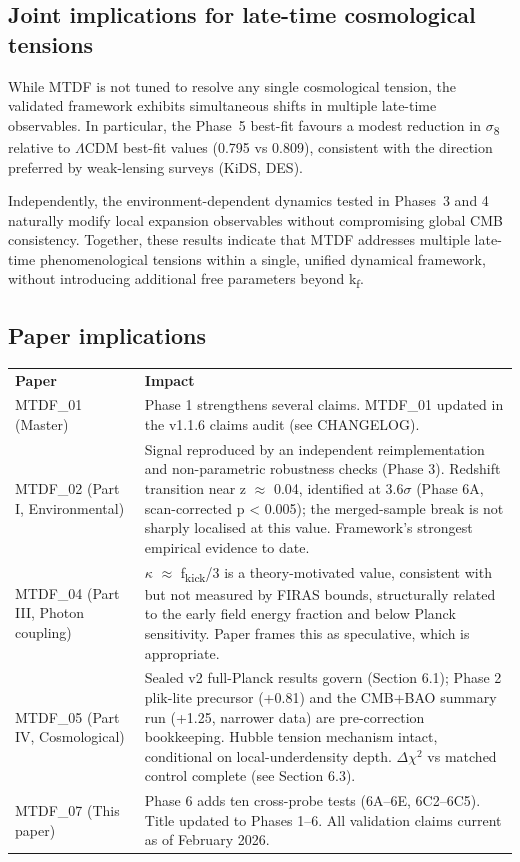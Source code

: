 \documentclass[11pt,a4paper]{article}
\begin{document}
\subsection{Joint implications for late-time cosmological tensions}
While MTDF is not tuned to resolve any single cosmological tension, the validated framework exhibits simultaneous shifts in multiple late-time observables. In particular, the Phase~5 best-fit favours a modest reduction in $\sigma$\textsubscript{8} relative to $\Lambda$CDM best-fit values (0.795 vs 0.809), consistent with the direction preferred by weak-lensing surveys (KiDS, DES).

Independently, the environment-dependent dynamics tested in Phases~3 and 4 naturally modify local expansion observables without compromising global CMB consistency. Together, these results indicate that MTDF addresses multiple late-time phenomenological tensions within a single, unified dynamical framework, without introducing additional free parameters beyond k\textsubscript{f}.

\subsection{Paper implications}
\begin{table}[H]
\centering
\footnotesize
\begin{tabularx}{\linewidth}{l>{\RaggedRight\arraybackslash}X}
\toprule
\textbf{Paper} & \textbf{Impact} \tabularnewline
MTDF\_\allowbreak{}01 (Master) & Phase 1 strengthens several claims. MTDF\_\allowbreak{}01 updated in the v1.1.6 claims audit (see CHANGELOG). \tabularnewline
MTDF\_\allowbreak{}02 (Part I, Environmental) & Signal reproduced by an independent reimplementation and non-parametric robustness checks (Phase 3). Redshift transition near z $\approx$ 0.04, identified at 3.6$\sigma$ (Phase 6A, scan-corrected p < 0.005); the merged-sample break is not sharply localised at this value. Framework's strongest empirical evidence to date. \tabularnewline
MTDF\_\allowbreak{}04 (Part III, Photon coupling) & $\kappa$ $\approx$ f\textsubscript{kick}/3 is a theory-motivated value, consistent with but not measured by FIRAS bounds, structurally related to the early field energy fraction and below Planck sensitivity. Paper frames this as speculative, which is appropriate. \tabularnewline
MTDF\_\allowbreak{}05 (Part IV, Cosmological) & Sealed v2 full-Planck results govern (Section 6.1); Phase 2 plik-lite precursor (+0.81) and the CMB+BAO summary run (+1.25, narrower data) are pre-correction bookkeeping. Hubble tension mechanism intact, conditional on local-underdensity depth. $\Delta$$\chi$$^{2}$ vs matched control complete (see Section 6.3). \tabularnewline
MTDF\_\allowbreak{}07 (This paper) & Phase 6 adds ten cross-probe tests (6A--6E, 6C2--6C5). Title updated to Phases 1--6. All validation claims current as of February 2026. \tabularnewline
\bottomrule
\end{tabularx}
\end{table}
\end{document}
